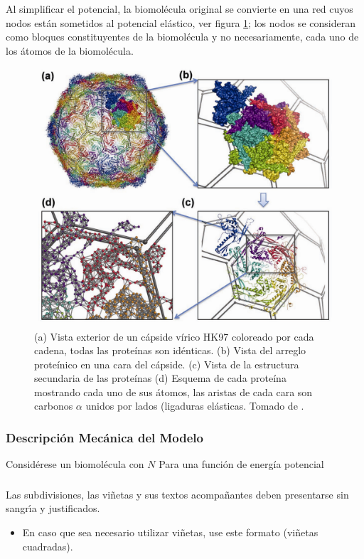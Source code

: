 Al simplificar el potencial, la biomol\'{e}cula original se convierte en una red cuyos nodos est\'{a}n sometidos al potencial el\'{a}stico, ver figura \ref{fig:pan}; los nodos se consideran como bloques constituyentes de la biomol\'{e}cula y no necesariamente, cada uno de los \'{a}tomos de la biomol\'{e}cula. 
\begin{figure}
\centering%
\includegraphics{dibujo.pdf}%
\caption{ (a) Vista exterior de un c\'{a}pside v\'{i}rico HK97 coloreado por cada cadena, todas las prote\'{i}nas son id\'{e}nticas. (b) Vista del arreglo prote\'{i}nico en una cara del c\'{a}pside. (c) Vista de la estructura secundaria de las prote\'{i}nas (d) Esquema de cada prote\'{i}na mostrando cada uno de sus \'{a}tomos, las aristas de cada cara son carbonos $\alpha$ unidos por lados (ligaduras el\'{a}sticas. Tomado de \cite{AG03p,AG04p}.} \label{fig:pan}
\end{figure}
\subsubsection{Descripci\'{o}n Mec\'{a}nica del Modelo}

Consid\'{e}rese un biomol\'{e}cula con $N$ 
Para una funci\'{o}n de energ\'{i}a potencial 

\subsubsection{}


Las subdivisiones, las vi\~{n}etas y sus textos acompa\~{n}antes deben presentarse sin sangr\'{\i}a y justificados.\\

\begin{itemize}
\item En caso que sea necesario utilizar vi\~{n}etas, use este formato (vi\~{n}etas cuadradas).
\end{itemize}